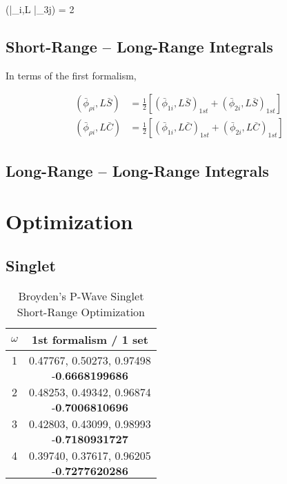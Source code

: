 \documentclass[Dissertation.tex]{subfiles}
\begin{document}
\beq
\nonumber \left(\bar{\phi}_{\rho i},L \bar{\phi}_{3j}\right) = 2 
\eeq

\subsection{Short-Range -- Long-Range Integrals}
\label{sec:PWave2ndShortLong}
In terms of the first formalism,

\begin{subequations}
\begin{align}
\left(\bar{\phi}_{\rho i},L \bar{S}\right) &= \frac{1}{2} \left[ \left(\bar{\phi}_{1i},L \bar{S}\right)_{1st} + \left(\bar{\phi}_{2i},L \bar{S}\right)_{1st} \right] \\
\left(\bar{\phi}_{\rho i},L \bar{C}\right) &= \frac{1}{2} \left[ \left(\bar{\phi}_{1i},L \bar{C}\right)_{1st} + \left(\bar{\phi}_{2i},L \bar{C}\right)_{1st} \right]
\end{align}
\end{subequations}


\subsection{Long-Range -- Long-Range Integrals}
\label{sec:PWave2ndLongLong}


\section{Optimization}
\label{sec:PWaveOpt}

\subsection{Singlet}

\begin{table}[H]
\centering
\begin{tabular}{c c}
\toprule
\toprule
$\omega$ & 1st formalism / 1 set \\
\midrule
\midrule
1 & 0.47767, 0.50273, 0.97498 \\
  & $\textbf{-0.6668199686}$ \\
\midrule
2 & 0.48253, 0.49342, 0.96874 \\
  & $\textbf{-0.7006810696}$ \\
\midrule
3 & 0.42803, 0.43099, 0.98993 \\
  & $\textbf{-0.7180931727}$ \\
\midrule
4 & 0.39740, 0.37617, 0.96205 \\
  & $\textbf{-0.7277620286}$ \\
\bottomrule
\bottomrule
\end{tabular}
\caption{Broyden's P-Wave Singlet Short-Range Optimization}
\label{tab:BroydenPWaveSingOpt}
\end{table}
\end{document}
